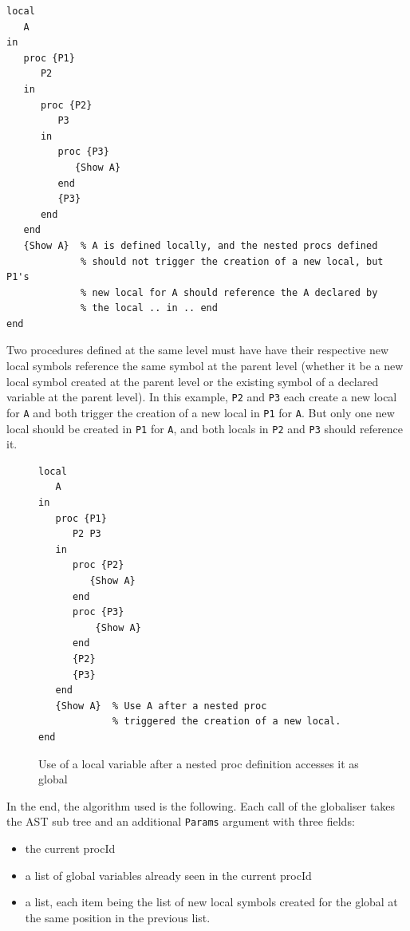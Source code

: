 \documentclass[a4paper]{memoir}
\begin{document}
\begin{lstlisting}
local
   A
in
   proc {P1}
      P2
   in
      proc {P2}
         P3
      in
         proc {P3}
            {Show A}
         end
         {P3}
      end
   end
   {Show A}  % A is defined locally, and the nested procs defined 
             % should not trigger the creation of a new local, but P1's
             % new local for A should reference the A declared by 
             % the local .. in .. end
end
\end{lstlisting}

Two procedures defined at the same level must have have their respective new local symbols reference the same symbol at the parent level (whether it be a new local symbol created at the parent level or the existing symbol of a declared variable at the parent level). In this example, \lstinline!P2! and \lstinline!P3! each create a new local for \lstinline!A! and both trigger the creation of a new local in \lstinline!P1! for \lstinline!A!. But only one new local should be created in \lstinline!P1! for \lstinline!A!, and both locals in \lstinline!P2! and \lstinline!P3! should reference it.


\begin{figure}[h]
\begin{lstlisting}
local
   A
in
   proc {P1}
      P2 P3
   in
      proc {P2}
         {Show A}
      end
      proc {P3}
          {Show A}
      end
      {P2}
      {P3}
   end
   {Show A}  % Use A after a nested proc 
             % triggered the creation of a new local.
end
\end{lstlisting}
\caption{Use of a local variable after a nested proc definition accesses it as
global}
\label{fig:globaliser:examplev}
\end{figure}


In the end, the algorithm used is the following.
Each call of the globaliser takes the AST sub tree and an additional \lstinline!Params! argument with three fields:
\begin{itemize}
   \item the current procId
   \item a list of global variables already seen in the current procId
   \item a list, each item being the list of new local symbols created for the
     global at the same position in the previous list.
\end{itemize}
\end{document}

